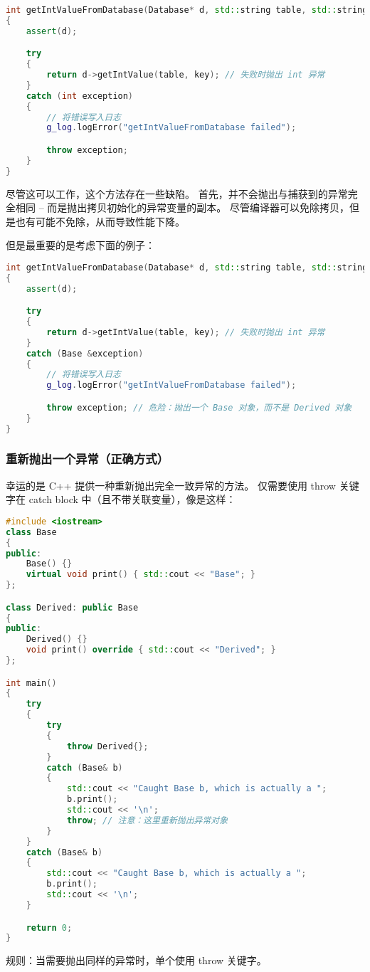 \documentclass[../../LearnCpp.tex]{subfiles}
\begin{document}
\begin{lstlisting}[language=C++]
int getIntValueFromDatabase(Database* d, std::string table, std::string key)
{
    assert(d);

    try
    {
        return d->getIntValue(table, key); // 失败时抛出 int 异常
    }
    catch (int exception)
    {
        // 将错误写入日志
        g_log.logError("getIntValueFromDatabase failed");

        throw exception;
    }
}
\end{lstlisting}

尽管这可以工作，这个方法存在一些缺陷。
首先，并不会抛出与捕获到的异常完全相同 -- 而是抛出拷贝初始化的异常变量的副本。
尽管编译器可以免除拷贝，但是也有可能不免除，从而导致性能下降。

但是最重要的是考虑下面的例子：

\begin{lstlisting}[language=C++]
int getIntValueFromDatabase(Database* d, std::string table, std::string key)
{
    assert(d);

    try
    {
        return d->getIntValue(table, key); // 失败时抛出 int 异常
    }
    catch (Base &exception)
    {
        // 将错误写入日志
        g_log.logError("getIntValueFromDatabase failed");

        throw exception; // 危险：抛出一个 Base 对象，而不是 Derived 对象
    }
}
\end{lstlisting}

\subsubsection*{重新抛出一个异常（正确方式）}

幸运的是 C++ 提供一种重新抛出完全一致异常的方法。
仅需要使用 throw 关键字在 catch block 中（且不带关联变量），像是这样：

\begin{lstlisting}[language=C++]
#include <iostream>
class Base
{
public:
    Base() {}
    virtual void print() { std::cout << "Base"; }
};

class Derived: public Base
{
public:
    Derived() {}
    void print() override { std::cout << "Derived"; }
};

int main()
{
    try
    {
        try
        {
            throw Derived{};
        }
        catch (Base& b)
        {
            std::cout << "Caught Base b, which is actually a ";
            b.print();
            std::cout << '\n';
            throw; // 注意：这里重新抛出异常对象
        }
    }
    catch (Base& b)
    {
        std::cout << "Caught Base b, which is actually a ";
        b.print();
        std::cout << '\n';
    }

    return 0;
}
\end{lstlisting}

规则：当需要抛出同样的异常时，单个使用 throw 关键字。
\end{document}
